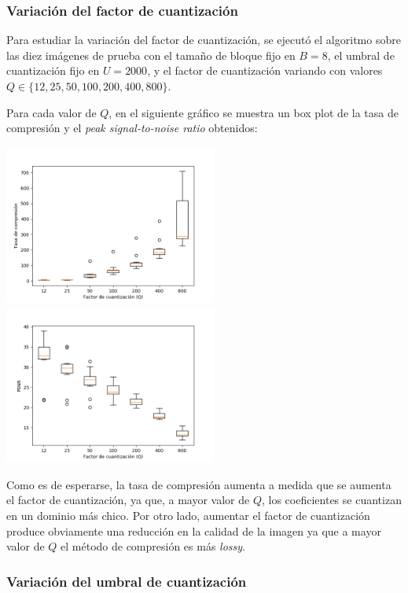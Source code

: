 \documentclass{article}
\newcommand{\set}[1]{\{#1\}}
\begin{document}
\subsubsection{Variación del factor de cuantización}

Para estudiar la variación del factor de cuantización, se ejecutó el
algoritmo sobre las diez imágenes de prueba con el
tamaño de bloque fijo en $B = 8$,
el umbral de cuantización fijo en $U = 2000$,
y el factor de cuantización variando con valores
$Q \in \set{12,25,50,100,200,400,800}$.

Para cada valor de $Q$, en el siguiente gráfico se muestra un
box plot de la tasa de compresión y el
{\em peak signal-to-noise ratio} obtenidos:\\
\begin{center}
\includegraphics[width=7cm]{../imgs/output/gray_plots/q_rate.png}
\includegraphics[width=7cm]{../imgs/output/gray_plots/q_psnr.png}
\end{center}

Como es de esperarse, la tasa de compresión aumenta a medida que
se aumenta el factor de cuantización, ya que, a mayor valor de $Q$,
los coeficientes se cuantizan en un dominio más chico.
Por otro lado, aumentar el factor de cuantización produce obviamente
una reducción en la calidad de la imagen ya que a mayor valor de $Q$
el método de compresión es más {\em lossy}.

\subsubsection{Variación del umbral de cuantización}
\end{document}
